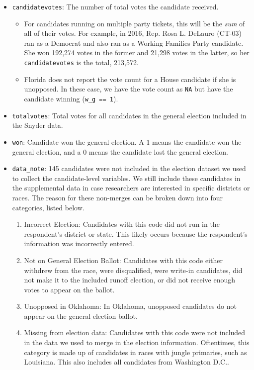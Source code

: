 \documentclass[12pt]{article}
\begin{document}
\begin{itemize}[leftmargin=*]
\item \texttt{candidatevotes}: The number of total votes the candidate received. 
\begin{itemize}
\item For candidates running on multiple party tickets, this will be the \emph{sum} of all of their votes.  For example, in 2016, Rep. Rosa L. DeLauro (CT-03) ran as a Democrat and also ran as a Working Families Party candidate. She won 192,274 votes in the former and 21,298 votes in the latter, so her \texttt{candidatevotes} is the total, 213,572.
\item  Florida does not report the vote count for a House candidate if she is unopposed. In these case, we have the vote count as \texttt{NA} but have the candidate winning (\texttt{w\_g == 1}).
\end{itemize}
				

\item \texttt{totalvotes}: Total votes for all candidates in the general election included in the Snyder data. 

\item \texttt{won}: Candidate won the general election. A 1 means the candidate won the general election, and a 0 means the candidate lost the general election. 

\item \texttt{data\_note}: 145 candidates were not included in the election dataset we used to collect the candidate-level variables. We still include these candidates in the supplemental data in case researchers are interested in specific districts or races. The reason for these non-merges can be broken down into four categories, listed below.
		\begin{enumerate}
			\item Incorrect Election: Candidates with this code  did not run in the respondent's district or state. This likely occurs because the respondent's information was incorrectly entered. 
			\item Not on General Election Ballot: Candidates with this code either withdrew from the race, were disqualified, were write-in candidates, did not make it to the included runoff election, or did not receive enough votes to appear on the ballot. 
			\item Unopposed in Oklahoma: In Oklahoma, unopposed candidates do not appear on the general election ballot. 
			\item Missing from election data: Candidates with this code were not included in the data we used to merge in the election information. Oftentimes, this category is made up of candidates in races with jungle primaries, such as Louisiana. This also includes all candidates from Washington D.C.. 
		\end{enumerate}
\end{itemize}
	
\end{document}

